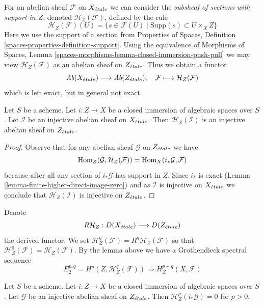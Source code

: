 \medskip\noindent
For an abelian sheaf $\mathcal{F}$ on $X_{\acute{e}tale}$ we can consider
the {\it subsheaf of sections with support in $Z$}, denoted
$\mathcal{H}_Z(\mathcal{F})$, defined by the rule
$$
\mathcal{H}_Z(\mathcal{F})(U) =
\{s \in \mathcal{F}(U) \mid \text{Supp}(s) \subset U \times_X Z\}
$$
Here we use the support of a section from
Properties of Spaces, Definition \ref{spaces-properties-definition-support}.
Using the equivalence of Morphisms of Spaces, Lemma
\ref{spaces-morphisms-lemma-closed-immersion-push-pull}
we may view $\mathcal{H}_Z(\mathcal{F})$ as an abelian sheaf on
$Z_{\acute{e}tale}$. Thus we obtain a functor
$$
\textit{Ab}(X_{\acute{e}tale}) \longrightarrow \textit{Ab}(Z_{\acute{e}tale}),\quad
\mathcal{F} \longmapsto \mathcal{H}_Z(\mathcal{F})
$$
which is left exact, but in general not exact.

\begin{lemma}
\label{lemma-sections-with-support-acyclic}
Let $S$ be a scheme.
Let $i : Z \to X$ be a closed immersion of algebraic spaces over $S$.
Let $\mathcal{I}$ be an injective abelian sheaf on $X_{\acute{e}tale}$.
Then $\mathcal{H}_Z(\mathcal{I})$ is an injective abelian sheaf
on $Z_{\acute{e}tale}$.
\end{lemma}

\begin{proof}
Observe that for any abelian sheaf $\mathcal{G}$ on $Z_{\acute{e}tale}$
we have
$$
\mathop{\mathrm{Hom}}\nolimits_Z(\mathcal{G}, \mathcal{H}_Z(\mathcal{F})) =
\mathop{\mathrm{Hom}}\nolimits_X(i_*\mathcal{G}, \mathcal{F})
$$
because after all any section of $i_*\mathcal{G}$ has support in $Z$.
Since $i_*$ is exact (Lemma \ref{lemma-finite-higher-direct-image-zero})
and as $\mathcal{I}$ is injective on $X_{\acute{e}tale}$ we conclude that
$\mathcal{H}_Z(\mathcal{I})$ is injective on $Z_{\acute{e}tale}$.
\end{proof}

\noindent
Denote
$$
R\mathcal{H}_Z : D(X_{\acute{e}tale}) \longrightarrow D(Z_{\acute{e}tale})
$$
the derived functor. We set
$\mathcal{H}^q_Z(\mathcal{F}) = R^q\mathcal{H}_Z(\mathcal{F})$ so that
$\mathcal{H}^0_Z(\mathcal{F}) = \mathcal{H}_Z(\mathcal{F})$.
By the lemma above we have a Grothendieck spectral sequence
$$
E_2^{p, q} = H^p(Z, \mathcal{H}^q_Z(\mathcal{F}))
\Rightarrow H^{p + q}_Z(X, \mathcal{F})
$$

\begin{lemma}
\label{lemma-cohomology-with-support-sheaf-on-support}
Let $S$ be a scheme. Let $i : Z \to X$ be a closed immersion of
algebraic spaces over $S$. Let $\mathcal{G}$ be an injective abelian
sheaf on $Z_{\acute{e}tale}$. Then $\mathcal{H}^p_Z(i_*\mathcal{G}) = 0$ for $p > 0$.
\end{lemma}

